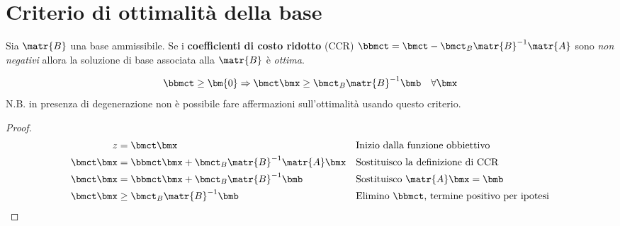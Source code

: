 \documentclass[\main/main.tex]{subfiles}
\begin{document}
\section{Criterio di ottimalità della base}
\begin{theorem}
  Sia $\matr{B}$ una base ammissibile. Se i \textbf{coefficienti di costo ridotto} (CCR) $\bbmct = \bmct - \bmct_B \matr{B}^{-1} \matr{A}$ sono \textit{non negativi} allora la soluzione di base associata alla $\matr{B}$ è \textit{ottima}.

  \[
    \bbmct \geq \bm{0} \Rightarrow \bmct \bmx \geq \bmct_B \matr{B}^{-1}\bmb \quad \forall \bmx
  \]
  N.B. in presenza di degenerazione non è possibile fare affermazioni sull'ottimalità usando questo criterio.
\end{theorem}


\begin{proof}
  \begin{align*}
    z          & =\bmct \bmx                                       &  & \text{Inizio dalla funzione obbiettivo}               \\
    \bmct \bmx & = \bbmct\bmx + \bmct_B \matr{B}^{-1} \matr{A}\bmx &  & \text{Sostituisco la definizione di CCR}              \\
    \bmct \bmx & = \bbmct\bmx + \bmct_B \matr{B}^{-1} \bmb         &  & \text{Sostituisco $\matr{A}\bmx = \bmb$}              \\
    \bmct \bmx & \geq \bmct_B \matr{B}^{-1} \bmb                   &  & \text{Elimino $\bbmct$, termine positivo per ipotesi}
  \end{align*}
\end{proof}
\end{document}
